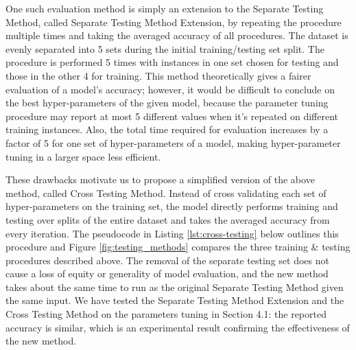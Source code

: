 \documentclass[letterpaper,twocolumn,10pt]{article}
\begin{document}
One such evaluation method is simply an extension to the Separate Testing Method, called Separate Testing Method Extension, by repeating the procedure multiple times and taking the averaged accuracy of all procedures. The dataset is evenly separated into 5 sets during the initial training/testing set split. The procedure is performed 5 times with instances in one set chosen for testing and those in the other 4 for training. This method theoretically gives a fairer evaluation of a model's accuracy; however, it would be difficult to conclude on the best hyper-parameters of the given model, because the parameter tuning procedure may report at most 5 different values when it's repeated on different training instances. Also, the total time required for evaluation increases by a factor of 5 for one set of hyper-parameters of a model, making hyper-parameter tuning in a larger space less efficient.

These drawbacks motivate us to propose a simplified version of the above method, called Cross Testing Method. Instead of cross validating each set of hyper-parameters on the training set, the model directly performs training and testing over splits of the entire dataset and takes the averaged accuracy from every iteration. The pseudocode in Listing \ref{lst:cross-testing} below outlines this procedure and Figure \ref{fig:testing_methods} compares the three training \& testing procedures described above. The removal of the separate testing set does not cause a loss of equity or generality of model evaluation, and the new method takes about the same time to run as the original Separate Testing Method given the same input. We have tested the Separate Testing Method Extension and the Cross Testing Method on the parameters tuning in Section 4.1: the reported accuracy is similar, which is an experimental result confirming the effectiveness of the new method.
\end{document}
